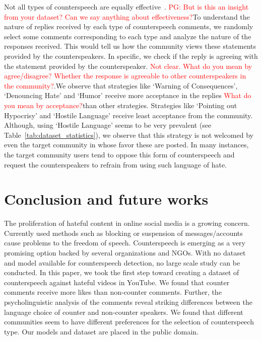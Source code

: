 \documentclass[11pt,a4paper]{article}
\newcommand{\TODO}[1]{\textcolor{red}{#1}}
\newcommand{\binny}[1]{\textcolor{blue}{[Binny: #1]}}
\begin{document}
{Not all types of counterspeech are equally effective~\cite{susan2016successfullcounter}. \TODO{PG: But is this an insight from your dataset? Can we say anything about effectiveness?}\fi To understand the nature of replies received by each type of counterspeech comments, we randomly select some comments corresponding to each type and analyze the nature of the responses received. This would tell us how the community views these statements provided by the counterspeakers. In specific, we check if the reply is agreeing with the statement provided by the counterspeaker. \TODO{Not clear. What do you mean by agree/disagree? Whether the response is agreeable to other counterspeakers in the community?}.\fi We observe that strategies like `Warning of Consequences', `Denouncing Hate' and `Humor' receive more acceptance in the replies \TODO{What do you mean by acceptance?}\fi than other strategies. Strategies like `Pointing out Hypocrisy' and `Hostile Language' receive least acceptance from the community. Although, using `Hostile Language' seems to be very prevalent (see Table~\ref{tab:dataset_statistics}), we observe that this strategy is not welcomed by even the target community in whose favor these are posted. In many instances, the target community users tend to oppose this form of counterspeech and request the counterspeakers to refrain from using such language of hate.









\iffalse{0}
While counterspeech may seem like a good solution, it also suffers from several problems. Most of the times, the number of people countering the hate speech is very small. \TODO{PG: but in your dataset, 42\% comments are counterspeech. So, are these made by very few people?}\binny{No sir. 1.13 comments per counterspeakers. What i intended to say was about minority likes(LGBT, Fat People, Rohingyas...)} 
\fi



\section{Conclusion and future works}

The proliferation of hateful content in online social media is a growing concern. Currently used methods such as blocking or suspension of messages/accounts cause problems to the freedom of speech. Counterspeech is emerging as a very promising option backed by several organizations and NGOs. With no dataset and model available for counterspeech detection, no large scale study can be conducted. In this paper, we took the first step toward creating a dataset of counterspeech against hateful videos in YouTube. We found that counter comments receive more likes than non-counter comments. Further, the psycholinguistic analysis of the comments reveal striking differences between the language choice of counter and non-counter speakers. We found that different communities seem to have different preferences for the selection of counterspeech type. Our models and dataset are placed in the public domain.

}
\end{document}
